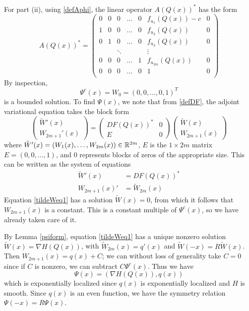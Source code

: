 \documentclass[thesis.tex]{subfiles}
\begin{document}
For part (ii), using \eqref{defAphi}, the linear operator $A(Q(x))^*$ has the form 
\begin{equation}\label{defAphi}
A(Q(x))^* = 
\begin{pmatrix}
0 & 0 & 0 & \dots & 0 & f_{u_1}(Q(x)) - c & 0 \\
1 & 0 & 0 & \dots & 0 & f_{u_2}(Q(x)) & 0 \\
0 & 1 & 0 & \dots & 0 & f_{u_3}(Q(x)) & 0 \\
&& \ddots &&& \vdots \\
0 & 0 & 0 & \dots & 1 & f_{u_{2m}}(Q(x)) & 0 \\
0 & 0 & 0 & \dots & 0 & 1 & 0 \\
\end{pmatrix}
\end{equation}
By inspection, 
\[
\Psi^c(x) = W_0 = (0, 0, \dots, 0, 1)^T
\]
is a bounded solution. To find $\Psi(x)$, we note that from \eqref{defDF}, the adjoint variational equation takes the block form
\[
\begin{pmatrix} \tilde{W}'(x) \\ W_{2m+1}'(x) \end{pmatrix}
= 
\begin{pmatrix}DF(Q(x))^* & 0 \\ E & 0 \end{pmatrix}\begin{pmatrix} \tilde{W}(x) \\ W_{2m+1}(x) \end{pmatrix}
\]
where $\tilde{W}'(x) = (W_1(x), \dots, W_{2m}(x)) \in \mathbb{R}^{2m}$, $E$ is the $1 \times 2m$ matrix $E = (0, 0, \dots, 1)$, and $0$ represents blocks of zeros of the appropriate size. This can be written as the system of equations
\begin{align}
\tilde{W}'(x) &= DF(Q(x))^* \label{tildeWeq1} \\
W_{2m+1}(x)' &= \tilde{W}_{2m}(x) \label{tildeWeq2}
\end{align}
Equation \eqref{tildeWeq1} has a solution $\tilde{W}(x) = 0$, from which it follows that $W_{2m+1}(x)$ is a constant. This is a constant multiple of $\Psi^c(x)$, so we have already taken care of it.

By Lemma \ref{psiform}, equation \eqref{tildeWeq1} has a unique nonzero solution $\tilde{W}(x) = \nabla H(Q(x))$, with $\tilde{W}_{2m}(x)=q'(x)$ and $\tilde{W}(-x) = R\tilde{W}(x)$. Then $W_{2m+1}(x) = q(x) + C$; we can without loss of generality take $C = 0$ since if $C$ is nonzero, we can subtract $C \Psi^c(x)$. Thus we have
\[
\Psi(x) = ( \nabla H(Q(x)), q(x) )
\]
which is exponentially localized since $q(x)$ is exponentially localized and $H$ is smooth. Since $q(x)$ is an even function, we have the symmetry relation $\Psi(-x) = R \Psi(x)$.
\end{document}
